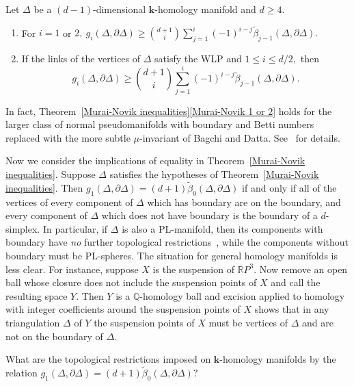 \documentclass[ALCO,ThmDefs,Unicode,epreuves]{cedram}
\newcommand{\field}{\mathbf{k}}
\newcommand{\R}{{\mathbb R}}
\newcommand{\Q}{{\mathbb Q}}
\begin{document}
\begin{theorem} \label{Murai-Novik inequalities} 
Let $\Delta$ be a $(d-1)$-dimensional $\field$-homology manifold and $d \ge 4.$ 
 \begin{enumerate}
 \item\label{theo7.6_1} \label{Murai-Novik 1 or 2} For $i = 1$ or $2,~ g_i(\Delta, \partial \Delta) \ge \binom{d+1}{i} \displaystyle\sum^i_{j=1} (-1)^{i-j} \tilde{\beta}_{j-1}(\Delta, \partial \Delta).$
 \item\label{theo7.6_2} If the links of the vertices of $\Delta$ satisfy the WLP and $1 \le i \le d/2,$ then 
 \[ 
 g_i(\Delta, \partial \Delta) \ge \binom{d+1}{i} \displaystyle\sum^i_{j=1} (-1)^{i-j} \tilde{\beta}_{j-1}(\Delta, \partial \Delta).
 \]
 \end{enumerate}
\end{theorem}

\noindent In fact, Theorem~\ref{Murai-Novik inequalities}\eqref{Murai-Novik 1 or 2} holds for the larger class of normal pseudomanifolds with boundary and Betti numbers replaced with the more subtle $\mu$-invariant of Bagchi and Datta. See~\cite[Theorem~7.3]{Murai-Novik-bdry} for details.


Now we consider the implications of equality in Theorem~\ref{Murai-Novik inequalities}. Suppose $\Delta$ satisfies the hypotheses of Theorem~\ref{Murai-Novik inequalities}. Then $g_1(\Delta, \partial \Delta) = (d+1) \tilde{\beta}_0(\Delta, \partial \Delta)$ if and only if all of the vertices of every component of $\Delta$ which has boundary are on the boundary, and every component of $\Delta$ which does not have boundary is the boundary of a $d$-simplex. In particular, if $\Delta$ is also a PL-manifold, then its components with boundary have \emph{no} further topological restrictions~\cite{Bing}, while the components without boundary must be PL-spheres. The situation for general homology manifolds is less clear. For instance, suppose $X$ is the suspension of $\R P^3.$ Now remove an open ball whose closure does not include the suspension points of $X$ and call the resulting space $Y.$ Then $Y$ is a $\Q$-homology ball and excision applied to homology with integer coefficients around the suspension points of $X$ shows that in any triangulation $\Delta$ of $Y$ the suspension points of $X$ must be vertices of $\Delta$ and are not on the boundary of $\Delta.$ 

\begin{ques}
 What are the topological restrictions imposed on $\field$-homology manifolds by the relation $g_1(\Delta, \partial \Delta) = (d+1) \tilde{\beta}_0(\Delta, \partial \Delta)?$
\end{ques}
\end{document}
